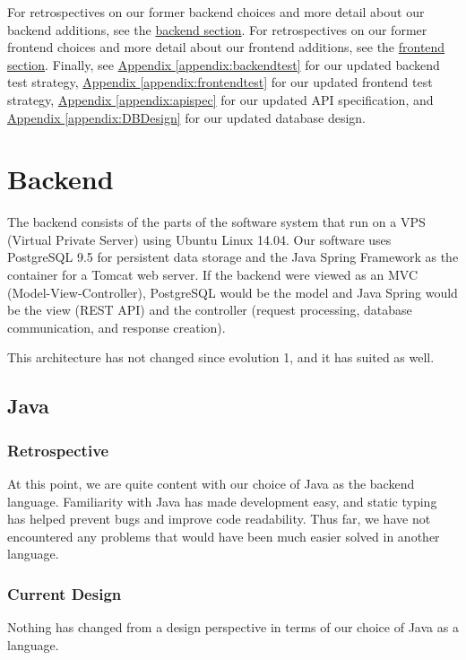 \documentclass[12pt]{article}
\begin{document}
For retrospectives on our former backend choices and more detail about our backend additions, see the \hyperref[sec:Backend]{backend section}. For retrospectives on our former frontend choices and more detail about our frontend additions, see the \hyperref[sec:Frontend]{frontend section}. Finally, see \hyperref[appendix:backendtest]{Appendix \ref{appendix:backendtest}} for our updated backend test strategy,  \hyperref[appendix:frontendtest]{Appendix \ref{appendix:frontendtest}} for our updated frontend test strategy, \hyperref[appendix:apispec]{Appendix \ref{appendix:apispec}} for our updated API specification, and \hyperref[appendix:DBDesign]{Appendix \ref{appendix:DBDesign}} for our updated database design. 

\section{Backend}
\label{sec:Backend}
The backend consists of the parts of the software system that run on a VPS (Virtual Private Server) using Ubuntu Linux 14.04. Our software uses PostgreSQL 9.5 for persistent data storage and the Java Spring Framework as the container for a Tomcat web server. If the backend were viewed as an MVC (Model-View-Controller), PostgreSQL would be the model and Java Spring would be the view (REST API) and the controller (request processing, database communication, and response creation). 

This architecture has not changed since evolution 1, and it has suited as well. 

\subsection{Java}
\subsubsection{Retrospective}
At this point, we are quite content with our choice of Java as the backend language. Familiarity with Java has made development easy, and static typing has helped prevent bugs and improve code readability. Thus far, we have not encountered any problems that would have been much easier solved in another language. 

\subsubsection{Current Design}
Nothing has changed from a design perspective in terms of our choice of Java as a language. 
\end{document}

